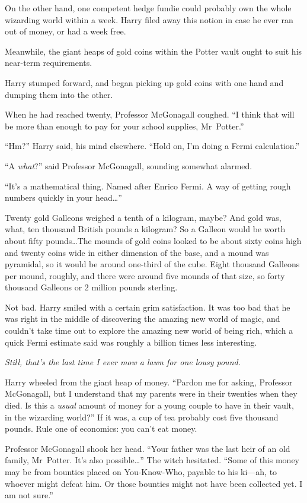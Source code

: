 On the other hand, one competent hedge fundie could probably own the whole wizarding world within a week. Harry filed away this notion in case he ever ran out of money, or had a week free.

Meanwhile, the giant heaps of gold coins within the Potter vault ought to suit his near-term requirements.

Harry stumped forward, and began picking up gold coins with one hand and dumping them into the other.

When he had reached twenty, Professor McGonagall coughed.
“I think that will be more than enough to pay for your school supplies, Mr~Potter.”

“Hm?” Harry said, his mind elsewhere.
“Hold on, I’m doing a Fermi calculation.”

“A \emph{what}?” said Professor McGonagall, sounding somewhat alarmed.

“It’s a mathematical thing. Named after Enrico Fermi. A way of getting rough numbers quickly in your head…”

Twenty gold Galleons weighed a tenth of a kilogram, maybe? And gold was, what, ten thousand British pounds a kilogram? So a Galleon would be worth about fifty pounds…The mounds of gold coins looked to be about sixty coins high and twenty coins wide in either dimension of the base, and a mound was pyramidal, so it would be around one-third of the cube. Eight thousand Galleons per mound, roughly, and there were around five mounds of that size, so forty thousand Galleons or 2 million pounds sterling.

Not bad. Harry smiled with a certain grim satisfaction. It was too bad that he was right in the middle of discovering the amazing new world of magic, and couldn’t take time out to explore the amazing new world of being rich, which a quick Fermi estimate said was roughly a billion times less interesting.

\emph{Still, that’s the last time I ever mow a lawn for one lousy pound.}

Harry wheeled from the giant heap of money.
“Pardon me for asking, Professor McGonagall, but I understand that my parents were in their twenties when they died. Is this a \emph{usual} amount of money for a young couple to have in their vault, in the wizarding world?” If it was, a cup of tea probably cost five thousand pounds. Rule one of economics: you can’t eat money.

Professor McGonagall shook her head.
“Your father was the last heir of an old family, Mr~Potter. It’s also possible…” The witch hesitated.
“Some of this money may be from bounties placed on You-Know-Who, payable to his ki—ah, to whoever might defeat him. Or those bounties might not have been collected yet. I am not sure.”

